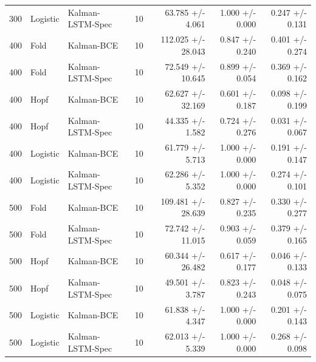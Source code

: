 \documentclass{article}
\begin{document}
\begin{table}[htbp]
\begin{tabular}{lllrrrr}
    300 & Logistic & Kalman-LSTM-Spec & 10 & 63.785 +/- 4.061 & 1.000 +/- 0.000 & 0.247 +/- 0.131 \\
    400 & Fold & Kalman-BCE & 10 & 112.025 +/- 28.043 & 0.847 +/- 0.240 & 0.401 +/- 0.274 \\
    400 & Fold & Kalman-LSTM-Spec & 10 & 72.549 +/- 10.645 & 0.899 +/- 0.054 & 0.369 +/- 0.162 \\
    400 & Hopf & Kalman-BCE & 10 & 62.627 +/- 32.169 & 0.601 +/- 0.187 & 0.098 +/- 0.199 \\
    400 & Hopf & Kalman-LSTM-Spec & 10 & 44.335 +/- 1.582 & 0.724 +/- 0.276 & 0.031 +/- 0.067 \\
    400 & Logistic & Kalman-BCE & 10 & 61.779 +/- 5.713 & 1.000 +/- 0.000 & 0.191 +/- 0.147 \\
    400 & Logistic & Kalman-LSTM-Spec & 10 & 62.286 +/- 5.352 & 1.000 +/- 0.000 & 0.274 +/- 0.101 \\
    500 & Fold & Kalman-BCE & 10 & 109.481 +/- 28.639 & 0.827 +/- 0.235 & 0.330 +/- 0.277 \\
    500 & Fold & Kalman-LSTM-Spec & 10 & 72.742 +/- 11.015 & 0.903 +/- 0.059 & 0.379 +/- 0.165 \\
    500 & Hopf & Kalman-BCE & 10 & 60.344 +/- 26.482 & 0.617 +/- 0.177 & 0.046 +/- 0.133 \\
    500 & Hopf & Kalman-LSTM-Spec & 10 & 49.501 +/- 3.787 & 0.823 +/- 0.243 & 0.048 +/- 0.075 \\
    500 & Logistic & Kalman-BCE & 10 & 61.838 +/- 4.347 & 1.000 +/- 0.000 & 0.201 +/- 0.143 \\
    500 & Logistic & Kalman-LSTM-Spec & 10 & 62.013 +/- 5.339 & 1.000 +/- 0.000 & 0.268 +/- 0.098 \\
    \bottomrule
  \end{tabular}
\end{table}
\end{document}
